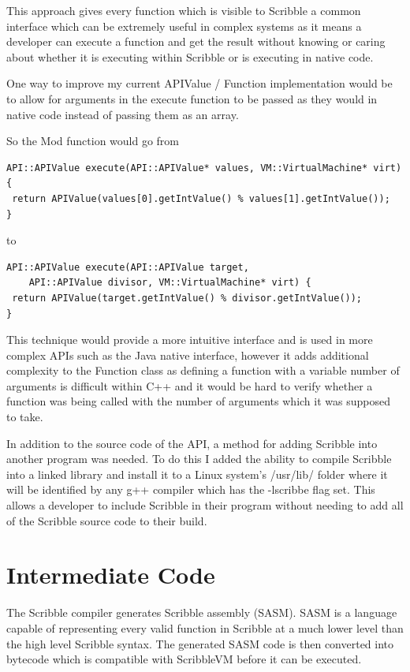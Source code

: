 \documentclass[]{final_report}
\begin{document}
This approach gives every function which is visible to Scribble a common interface which can be extremely useful in complex systems as it means a developer can execute a function and get the result without knowing or caring about whether it is executing within Scribble or is executing in native code.

One way to improve my current APIValue / Function implementation would be to allow for arguments in the execute function to be passed as they would in native code instead of passing them as an array.

So the Mod function would go from
\begin{verbatim}
API::APIValue execute(API::APIValue* values, VM::VirtualMachine* virt) {
 return APIValue(values[0].getIntValue() % values[1].getIntValue());
}
\end{verbatim}
to
\begin{verbatim}
API::APIValue execute(API::APIValue target, 
    API::APIValue divisor, VM::VirtualMachine* virt) {
 return APIValue(target.getIntValue() % divisor.getIntValue());
}
\end{verbatim}

This technique would provide a more intuitive interface and is used in more complex APIs such as the Java native interface, however it adds additional complexity to the Function class as defining a function with a variable number of arguments is difficult within C++ and it would be hard to verify whether a function was being called with the number of arguments which it was supposed to take.

In addition to the source code of the API, a method for adding Scribble into another program was needed. To do this I added the ability to compile Scribble into a linked library and install it to a Linux system's /usr/lib/ folder where it will be identified by any g++ compiler which has the -lscribbe flag set. This allows a developer to include Scribble in their program without needing to add all of the Scribble source code to their build.

\chapter{Intermediate Code}

The Scribble compiler generates Scribble assembly (SASM). SASM is a language capable of representing every valid function in Scribble at a much lower level than the high level Scribble syntax. The generated SASM code is then converted into bytecode which is compatible with ScribbleVM before it can be executed.
\end{document}
